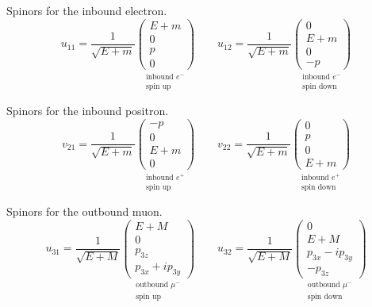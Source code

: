 Spinors for the inbound electron.
\begin{equation*}
u_{11}=\frac{1}{\sqrt{E+m}}
\underset{\substack{\text{inbound $e^-$}\\ \text{spin up}}}
{\begin{pmatrix}E+m\\0\\p\\0\end{pmatrix}}
\qquad
u_{12}=\frac{1}{\sqrt{E+m}}
\underset{\substack{\text{inbound $e^-$}\\ \text{spin down}}}
{\begin{pmatrix}0\\E+m\\0\\-p\end{pmatrix}}
\end{equation*}

Spinors for the inbound positron.
\begin{equation*}
v_{21}=\frac{1}{\sqrt{E+m}}
\underset{\substack{\text{inbound $e^+$}\\ \text{spin up}}}
{\begin{pmatrix}-p\\0\\E+m\\0\end{pmatrix}}
\qquad
v_{22}=\frac{1}{\sqrt{E+m}}
\underset{\substack{\text{inbound $e^+$}\\ \text{spin down}}}
{\begin{pmatrix}0\\p\\0\\E+m\end{pmatrix}}
\end{equation*}

Spinors for the outbound muon.
\begin{equation*}
u_{31}=\frac{1}{\sqrt{E+M}}
\underset{\substack{\text{outbound $\mu^-$}\\ \text{spin up}}}
{\begin{pmatrix}E+M\\0\\p_{3z}\\p_{3x}+ip_{3y}\end{pmatrix}}
\qquad
u_{32}=\frac{1}{\sqrt{E+M}}
\underset{\substack{\text{outbound $\mu^-$}\\ \text{spin down}}}
{\begin{pmatrix}0\\E+M\\p_{3x}-ip_{3y}\\-p_{3z}\end{pmatrix}}
\end{equation*}

